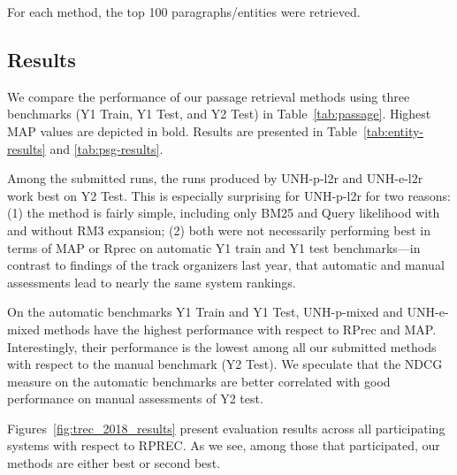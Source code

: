 \documentclass{article}
\begin{document}
For each method, the top 100 paragraphs/entities were retrieved.

\subsection{Results}

We compare the performance of our passage retrieval methods using three benchmarks (Y1 Train, Y1 Test, and Y2 Test) in Table~\ref{tab:passage}.
Highest MAP values are depicted in bold. Results are presented in Table~\ref{tab:entity-results} and \ref{tab:psg-results}.

Among the submitted runs, the runs produced by UNH-p-l2r and UNH-e-l2r work best on Y2 Test. This is especially surprising for UNH-p-l2r for two reasons: (1) the method is fairly simple, including only BM25 and Query likelihood with and without RM3 expansion; (2) both were not necessarily performing best in terms of MAP or Rprec on automatic Y1 train and Y1 test benchmarks---in contrast to findings of the track organizers last year, that automatic and manual assessments lead to nearly the same system rankings.

On the automatic benchmarks Y1 Train and Y1 Test, UNH-p-mixed and UNH-e-mixed methods have the highest performance with respect to RPrec and MAP. Interestingly, their performance is the lowest among all our submitted methods with respect to the manual benchmark (Y2 Test). We speculate that the NDCG measure on the automatic benchmarks are better correlated with good performance on manual assessments of Y2 test.

Figures~\ref{fig:trec_2018_results} present evaluation results across all participating systems with respect to RPREC. As we see, among those that participated, our methods are either best or second best.
\end{document}
